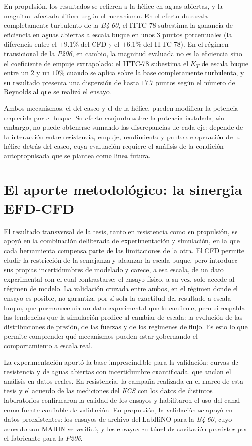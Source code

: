 En propulsión, los resultados se refieren a la hélice en aguas abiertas, y la
magnitud afectada difiere según el mecanismo. En el efecto de escala completamente
turbulento de la \textit{B4-60}, el ITTC-78 subestima la ganancia de eficiencia en aguas
abiertas a escala buque en unos $3$ puntos porcentuales (la diferencia entre el
$+9{.}1\%$ del CFD y el $+6{.}1\%$ del ITTC-78). En el régimen transicional de la
\textit{P206}, en cambio, la magnitud evaluada no es la eficiencia sino el coeficiente de
empuje extrapolado: el ITTC-78 subestima el $K_T$ de escala buque entre un $2$ y un
$10\%$ cuando se aplica sobre la base completamente turbulenta, y su resultado
presenta una dispersión de hasta $17{.}7$ puntos según el número de Reynolds al que
se realizó el ensayo.

Ambos mecanismos, el del casco y el de la hélice, pueden modificar la potencia
requerida por el buque. Su efecto conjunto sobre la potencia instalada, sin embargo,
no puede obtenerse sumando las discrepancias de cada eje: depende de la interacción
entre resistencia, empuje, rendimiento y punto de operación de la hélice detrás del
casco, cuya evaluación requiere el análisis de la condición autopropulsada que se
plantea como línea futura.

\section{El aporte metodológico: la sinergia EFD-CFD}

El resultado transversal de la tesis, tanto en resistencia como en propulsión, se
apoyó en la combinación deliberada de experimentación y simulación, en la que cada
herramienta compensa parte de las limitaciones de la otra. El CFD permite eludir la
restricción de la semejanza y alcanzar la escala buque, pero introduce sus propias
incertidumbres de modelado y carece, a esa escala, de un dato experimental con el
cual contrastarse; el ensayo físico, a su vez, solo accede al régimen de modelo. La
validación cruzada entre ambos, en el régimen donde el ensayo es posible, no garantiza
por sí sola la exactitud del resultado a escala buque, que permanece sin un dato experimental que lo confirme, pero sí respalda las tendencias que la simulación
predice al cambiar de escala: la evolución de las distribuciones de presión, de las
fuerzas y de los regímenes de flujo. Es esto lo que permite comprender qué mecanismos
pueden estar gobernando el comportamiento a escala real.

La experimentación aportó la base imprescindible para la validación: curvas de
resistencia y de aguas abiertas con incertidumbre cuantificada, que anclan el
análisis en datos reales. En resistencia, la campaña realizada en el marco de esta
tesis y el acuerdo de las mediciones del \textit{KCS} con los datos de distintos
laboratorios confirmaron la calidad de los ensayos y habilitaron el uso del canal
como fuente confiable de validación. En propulsión, la validación se apoyó en datos
preexistentes: los ensayos de archivo del LabHiNO para la \textit{B4-60}, cuyo acuerdo con
MARIN se verificó, y los ensayos en túnel de cavitación provistos por el fabricante
para la \textit{P206}.

